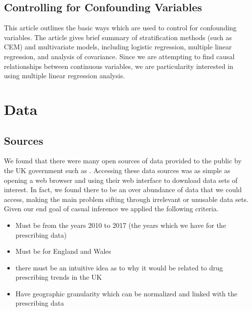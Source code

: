 \documentclass[a4paper]{article}
\begin{document}
	\subsection{Controlling for Confounding Variables ~\cite{ref:LinReg}}
		This article outlines the basic ways which are used to control for confounding variables.
		The article gives brief summary of stratification methods (such as CEM) and multivariate models,
		including logistic regression, multiple linear regression, and analysis of covariance.
		Since we are attempting to find causal relationships between continuous variables, we 
		are particularity interested in using multiple linear regression analysis.
		

\section{Data}
	\subsection{Sources}
		We found that there were many open sources of data provided to the public
		by the UK government such as %
		. Accessing these data sources was as simple as opening a web browser
		and using their web interface to download data sets of interest. In fact,
		we found there to be an over abundance of data that we could access, making 
		the main problem sifting through irrelevant or unusable data sets. Given our
		end goal of casual inference we applied the following criteria. 
		\begin{itemize}
			\item Must be from the years 2010 to 2017 (the years which we have for the prescribing data)
			\item Must be for England and Wales 
			\item there must be an intuitive idea as to why it would be related to drug prescribing trends in the UK
			\item Have geographic granularity which can be normalized and linked with the prescribing data
		\end{itemize}
\end{document}
